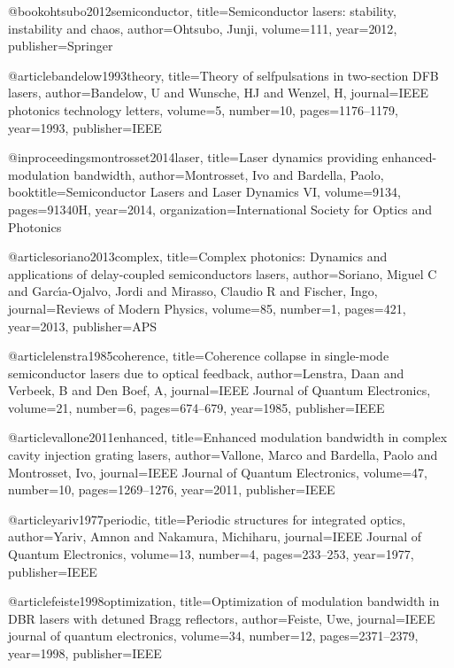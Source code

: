 @book{ohtsubo2012semiconductor,
  title={Semiconductor lasers: stability, instability and chaos},
  author={Ohtsubo, Junji},
  volume={111},
  year={2012},
  publisher={Springer}
}

@article{bandelow1993theory,
  title={Theory of selfpulsations in two-section DFB lasers},
  author={Bandelow, U and Wunsche, HJ and Wenzel, H},
  journal={IEEE photonics technology letters},
  volume={5},
  number={10},
  pages={1176--1179},
  year={1993},
  publisher={IEEE}
}

@inproceedings{montrosset2014laser,
  title={Laser dynamics providing enhanced-modulation bandwidth},
  author={Montrosset, Ivo and Bardella, Paolo},
  booktitle={Semiconductor Lasers and Laser Dynamics VI},
  volume={9134},
  pages={91340H},
  year={2014},
  organization={International Society for Optics and Photonics}
}

@article{soriano2013complex,
  title={Complex photonics: Dynamics and applications of delay-coupled semiconductors lasers},
  author={Soriano, Miguel C and Garc{\'\i}a-Ojalvo, Jordi and Mirasso, Claudio R and Fischer, Ingo},
  journal={Reviews of Modern Physics},
  volume={85},
  number={1},
  pages={421},
  year={2013},
  publisher={APS}
}

@article{lenstra1985coherence,
  title={Coherence collapse in single-mode semiconductor lasers due to optical feedback},
  author={Lenstra, Daan and Verbeek, B and Den Boef, A},
  journal={IEEE Journal of Quantum Electronics},
  volume={21},
  number={6},
  pages={674--679},
  year={1985},
  publisher={IEEE}
}

@article{vallone2011enhanced,
  title={Enhanced modulation bandwidth in complex cavity injection grating lasers},
  author={Vallone, Marco and Bardella, Paolo and Montrosset, Ivo},
  journal={IEEE Journal of Quantum Electronics},
  volume={47},
  number={10},
  pages={1269--1276},
  year={2011},
  publisher={IEEE}
}

@article{yariv1977periodic,
  title={Periodic structures for integrated optics},
  author={Yariv, Amnon and Nakamura, Michiharu},
  journal={IEEE Journal of Quantum Electronics},
  volume={13},
  number={4},
  pages={233--253},
  year={1977},
  publisher={IEEE}
}

@article{feiste1998optimization,
  title={Optimization of modulation bandwidth in DBR lasers with detuned Bragg reflectors},
  author={Feiste, Uwe},
  journal={IEEE journal of quantum electronics},
  volume={34},
  number={12},
  pages={2371--2379},
  year={1998},
  publisher={IEEE}
}

